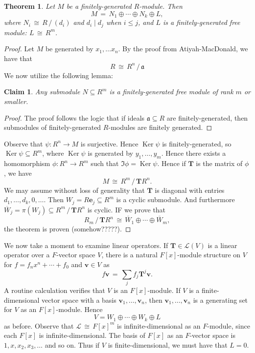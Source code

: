 \documentclass[11pt]{article}
\newtheorem{theorem}{Theorem}
\newtheorem{claim}{Claim}
\newcommand{\Ker}{\operatorname{Ker}}
\renewcommand{\vec}[1]{\mathbf{#1}}
\newcommand{\mat}[1]{\mathbf{#1}}
\begin{document}
\begin{adjustwidth}{0.5cm}{}
  \begin{theorem}
    Let $M$ be a finitely-generated $R$-module. Then
    \[
      M \, = \, N_{1} \oplus \cdots \oplus N_{k} \oplus L,
    \]
    where $N_{i} \, \cong \, R \, / \, (d_{i})$ and $d_{i} \mid d_{j}$ when $i \le j$, and $L$ is a finitely-generated free module: $L \, \cong \, R^{m}$.
  \end{theorem}
  \begin{proof}
    Let $M$ be generated by $x_{1}, \ldots x_{n}$. By the proof from Atiyah-MacDonald, we have that
    \[
      R \, \cong \, R^{n} \, / \, \mathfrak{a}
    \]
    We now utilize the following lemma:
    \begin{adjustwidth}{0.5cm}{}
      \begin{claim}
        Any submodule $N \subseteq R^{m}$ is a finitely-generated free module of rank $m$ or smaller.
      \end{claim}
      \begin{proof}
        The proof follows the logic that if ideals $\mathfrak{a} \subseteq R$ are finitely-generated, then submodules of finitely-generated $R$-modules are finitely generated.
      \end{proof}
    \end{adjustwidth}
    Observe that $\psi : R^{n} \to M$ is surjective. Hence $\Ker \psi$ is finitely-generated, so $\Ker \psi \subseteq R^{m}$, where $\Ker \psi$ is generated by $y_{1}, \ldots, y_{m}$. Hence there exists a homomorphism $\phi : R^{n} \to R^{m}$ such that $\Im \phi = \Ker \psi$. Hence if $\mat{T}$ is the matrix of $\phi$, we have
    \[
      M \, \cong \, R^{m} \, / \, \mat{T} R^{n}.
    \]
    We may assume without loss of generality that $\mat{T}$ is diagonal with entries $d_{1}, \ldots, d_{k}, 0, \ldots$. Then $W_{j} = R \vec{e}_{j} \subseteq R^{m}$ is a cyclic submodule. And furthermore $\overline{W}_{j} = \pi(W_{j}) \subseteq R^{m} \, / \, \mat{T} R^{n}$ is cyclic. IF we prove that
    \[
      R_{m} \, / \, \mat{T} R^{n} \, \cong \, \overline{W}_{1} \oplus \cdots \oplus \overline{W}_{m},
    \]
    the theorem is proven (somehow?????).
  \end{proof}
\end{adjustwidth}

We now take a moment to examine linear operators. If $\mat{T} \in \mathcal{L}(V)$ is a linear operator over a $F$-vector space $V$, there is a natural $F[x]$-module structure on $V$ for $f = f_{n}x^{n} + \cdots + f_{0}$ and $\vec{v} \in V$ as
\[
  f \vec{v} \, = \, \sum\limits_{j} f_{j} \mat{T}^{j} \vec{v}.
\]
A routine calculation verifies that $V$ is an $F[x]$-module. If $V$ is a finite-dimensional vector space with a basis $\vec{v}_{1}, \ldots, \vec{v}_{n}$, then $\vec{v}_{1}, \ldots, \vec{v}_{n}$ is a generating set for $V$ as an $F[x]$-module. Hence
\[
  V = W_{1} \oplus \cdots \oplus W_{k} \oplus L
\]
as before. Observe that $\mathcal{L} \, \cong \, F[x]^{m}$ is infinite-dimensional as an $F$-module, since each $F[x]$ is infinite-dimensional. The basis of $F[x]$ as an $F$-vector space is $1, x, x_{2}, x_{3}, \ldots$ and so on. Thus if $V$ is finite-dimensional, we must have that $L = 0$.
\end{document}
